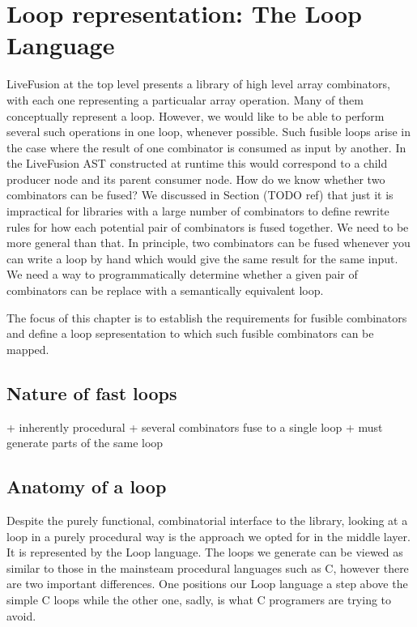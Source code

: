 

\section{Loop representation: The Loop Language}

LiveFusion at the top level presents a library of high level array combinators, with each one representing a particualar array operation. Many of them conceptually represent a loop. However, we would like to be able to perform several such operations in one loop, whenever possible. Such fusible loops arise in the case where the result of one combinator is consumed as input by another. In the LiveFusion AST constructed at runtime this would correspond to a child producer node and its parent consumer node. How do we know whether two combinators can be fused? We discussed in Section (TODO ref) that just it is impractical for libraries with a large number of combinators to define rewrite rules for how each potential pair of combinators is fused together. We need to be more general than that. In principle, two combinators can be fused whenever you can write a loop by hand which would give the same result for the same input. We need a way to programmatically determine whether a given pair of combinators can be replace with a semantically equivalent loop.

The focus of this chapter is to establish the requirements for fusible combinators and define a loop sepresentation to which such fusible combinators can be mapped.



\subsection{Nature of fast loops}

+ inherently procedural
+ several combinators fuse to a single loop
+ must generate parts of the same loop



\subsection{Anatomy of a loop}

Despite the purely functional, combinatorial interface to the library, looking at a loop in a purely procedural way is the approach we opted for in the middle layer. It is represented by the Loop language. The loops we generate can be viewed as similar to those in the mainsteam procedural languages such as C, however there are two important differences. One positions our Loop language a step above the simple C loops while the other one, sadly, is what C programers are trying to avoid.

